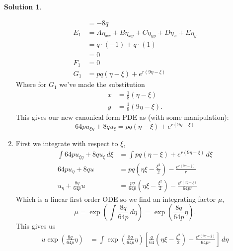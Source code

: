\documentclass[10pt]{article}
\theoremstyle{definition}
\newtheorem{soln}{Solution}
\begin{document}
\begin{soln}
\begin{enumerate}[label=(\alph*)]
\begin{align*}
                & =-8q                                                               \\
            E_1 & =A\eta_{xx}+B\eta_{xy}+C\eta_{yy}+D\eta_{x}+E\eta_{y}              \\
                & =q\cdot(-1)+q\cdot(1)                                              \\
                & =0                                                                 \\
            F_1 & =0                                                                 \\
            G_1 & =pq\left(\eta-\xi\right)+e^{r\left(9\eta-\xi\right)}
          \end{align*}
          Where for $G_1$ we've made the substitution
          \begin{align*}
            x & =\frac{1}{8}\left(\eta-\xi\right)   \\
            y & =\frac{1}{8}\left(9\eta-\xi\right).
          \end{align*}
          This gives our new canonical form PDE as (with some manipulation):
          $$64pu_{\xi\eta}+8qu_\xi=pq\left(\eta-\xi\right)+e^{r\left(9\eta-\xi\right)}$$
    \item First we integrate with respect to $\xi$,
          \begin{align*}
            \int64pu_{\xi\eta}+8qu_\xi\,d\xi & =\int pq\left(\eta-\xi\right)+e^{r\left(9\eta-\xi\right)}\,d\xi                                                  \\
            64pu_{\eta}+8qu                  & =pq \left({\eta}{\xi} - \frac{{\xi}^{2}}{2}\right) - \frac{e^{r \left(9{\eta} - {\xi}\right)}}{r}                \\
            u_{\eta}+\frac{8q}{64p}u         & =\frac{pq}{64p} \left({\eta}{\xi} - \frac{{\xi}^{2}}{2}\right) - \frac{e^{r \left(9{\eta} - {\xi}\right)}}{64pr}
          \end{align*}
          Which is a linear first order ODE so we find an integrating factor $\mu$,
          $$\mu=\exp\left(\int\frac{8q}{64p}\,d\eta\right)=\exp\left(\frac{8q}{64p}\eta\right).$$
          This gives us
          \begin{align*}
            u\exp\left(\frac{8q}{64p}\eta\right) & =\int\exp\left(\frac{8q}{64p}\eta\right)
            \left[\frac{q}{64} \left({\eta}{\xi} - \frac{{\xi}^{2}}{2}\right) - \frac{e^{r \left(9{\eta} - {\xi}\right)}}{64pr}\right]\,d\eta                                                                                                                          \\

\end{align*}
\end{enumerate}
\end{soln}
\end{document}
